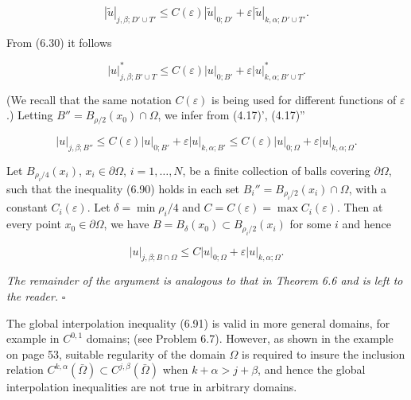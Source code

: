 \begin{equation*}
|\tilde{u}|_{j,\beta;D' \cup T'} \leq C(\varepsilon)|\tilde{u}|_{0;D'} + \varepsilon |\tilde{u}|_{k,\alpha;D' \cup T'}.
\end{equation*}

\noindent From (6.30) it follows

\begin{equation*}
|u|^{*}_{j,\beta;B' \cup T} \leq C(\varepsilon)|u|_{0;B'} + \varepsilon |u|^{*}_{k,\alpha;B' \cup T}.
\end{equation*}

\noindent (We recall that the same notation $C(\varepsilon)$ is being used for different functions of $\varepsilon$.) Letting $B'' = B_{\rho/2}(x_0)\cap\Omega$, we infer from (4.17)', (4.17)''

\begin{equation}\tag{6.92}
|u|_{j,\beta;B''} \leq C(\varepsilon)|u|_{0;B'} + \varepsilon |u|_{k,\alpha;B'}
 \leq C(\varepsilon)|u|_{0;\Omega} + \varepsilon |u|_{k,\alpha;\Omega}.
\end{equation}

\noindent Let $B_{\rho_i/4}(x_i)$, $x_i \in \partial\Omega$, $i = 1, \dots, N$, be a finite collection of balls covering $\partial\Omega$, such that the inequality (6.90) holds in each set $B_i'' = B_{\rho_i/2}(x_i)\cap\Omega$, with a constant $C_i(\varepsilon)$. Let $\delta = \min \rho_i/4$ and $C = C(\varepsilon) = \max C_i(\varepsilon)$. Then at every point $x_0 \in \partial\Omega$, we have $B = B_\delta(x_0) \subset B_{\rho_i/2}(x_i)$ for some $i$ and hence

\begin{equation}\tag{6.93}
|u|_{j,\beta;B\cap\Omega} \leq C|u|_{0;\Omega} + \varepsilon |u|_{k,\alpha;\Omega}.
\end{equation}

\noindent\emph{The remainder of the argument is analogous to that in Theorem 6.6 and is left to the reader.} \hfill $\square$



\begin{flushleft}
The global interpolation inequality (6.91) is valid in more general domains, for
example in $C^{0,1}$ domains; (see Problem 6.7). However, as shown in the example on
page 53, suitable regularity of the domain $\Omega$ is required to insure the inclusion
relation $C^{k,\alpha}(\bar{\Omega}) \subset C^{j,\beta}(\bar{\Omega})$ when $k+\alpha > j+\beta$, and hence the global interpolation
inequalities are not true in arbitrary domains.
\end{flushleft}

